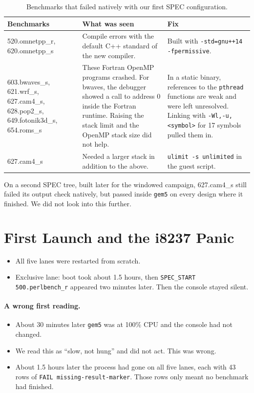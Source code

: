 \begin{table}[H]
\centering
\small
\caption{Benchmarks that failed natively with our first SPEC configuration.}
\label{tab:chr_native}
\begin{tabularx}{\textwidth}{>{\raggedright\arraybackslash}p{3.6cm} X X}
\toprule
\textbf{Benchmarks} & \textbf{What was seen} & \textbf{Fix} \\
\midrule
520.omnetpp\_r, 620.omnetpp\_s & Compile errors with the default C++ standard of the new compiler. & Built with \texttt{-std=gnu++14 -fpermissive}. \\
603.bwaves\_s, 621.wrf\_s, 627.cam4\_s, 628.pop2\_s, 649.fotonik3d\_s, 654.roms\_s & These Fortran OpenMP programs crashed. For bwaves, the debugger showed a call to address 0 inside the Fortran runtime. Raising the stack limit and the OpenMP stack size did not help. & In a static binary, references to the \texttt{pthread} functions are weak and were left unresolved. Linking with \texttt{-Wl,-u,<symbol>} for 17 symbols pulled them in. \\
627.cam4\_s & Needed a larger stack in addition to the above. & \texttt{ulimit -s unlimited} in the guest script. \\
\bottomrule
\end{tabularx}
\end{table}

\noindent On a second SPEC tree, built later for the windowed campaign, 627.cam4\_s still failed its output check natively, but passed inside \texttt{gem5} on every design where it finished. We did not look into this further.

\section{First Launch and the i8237 Panic}
\label{sec:chr_i8237}

\begin{itemize}
    \item All five lanes were restarted from scratch.
    \item Exclusive lane: boot took about 1.5 hours, then \texttt{SPEC\_START 500.perlbench\_r} appeared two minutes later. Then the console stayed silent.
\end{itemize}

\paragraph{A wrong first reading.}
\begin{itemize}
    \item About 30 minutes later \texttt{gem5} was at 100\% CPU and the console had not changed.
    \item We read this as ``slow, not hung'' and did not act. This was wrong.
    \item About 1.5 hours later the process had gone on all five lanes, each with 43 rows of \texttt{FAIL missing-result-marker}. Those rows only meant no benchmark had finished.
\end{itemize}

